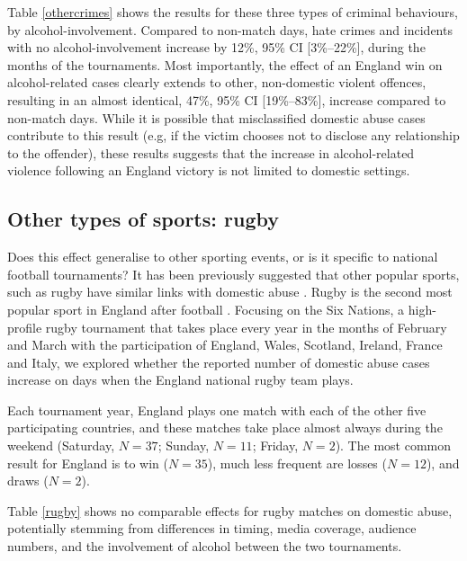 \documentclass[12pt, a4paper]{article}
\begin{document}
Table \ref{othercrimes} shows the results for these three types of criminal behaviours, by alcohol-involvement. Compared to non-match days, hate crimes and incidents with no alcohol-involvement increase by 12\%, 95\% CI [3\%--22\%], during the months of the tournaments. Most importantly, the effect of an England win on alcohol-related cases clearly extends to other, non-domestic violent offences, resulting in an almost identical, 47\%, 95\% CI [19\%--83\%], increase compared to non-match days. While it is possible that misclassified domestic abuse cases contribute to this result (e.g, if the victim chooses not to disclose any relationship to the offender), these results suggests that the increase in alcohol-related violence following an England victory is not limited to domestic settings. 




\subsection{Other types of sports: rugby}
Does this effect generalise to other sporting events, or is it specific to national football tournaments? It has been previously suggested that other popular sports, such as rugby have similar links with domestic abuse \cite{Brooks-Hay2018}. Rugby is the second most popular sport in England after football \cite{Ipsos2003}. Focusing on the Six Nations, a high-profile rugby tournament that takes place every year in the months of February and March with the participation of England, Wales, Scotland, Ireland, France and Italy, we explored whether the reported number of domestic abuse cases increase on days when the England national rugby team plays. 

Each tournament year, England plays one match with each of the other five participating countries, and these matches take place almost always during the weekend (Saturday, $N = 37$; Sunday, $N = 11$; Friday, $N = 2$). The most common result for England is to win ($N = 35$), much less frequent are losses ($N = 12$), and draws ($N = 2$).


Table \ref{rugby} shows no comparable effects for rugby matches on domestic abuse, potentially stemming from differences in timing, media coverage, audience numbers, and the involvement of alcohol between the two tournaments.
\end{document}

